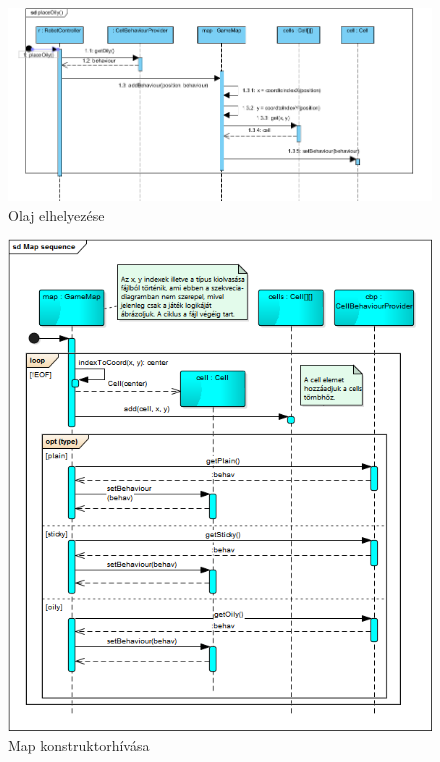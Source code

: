 \begin{figure}[!htbp]
	\begin{center}
		\includegraphics[width=\textwidth, center]{./chapters/chapter03/oily.png}
		\caption{Olaj elhelyezése}
	\end{center}
\end{figure}

\begin{figure}[!htbp]
	\begin{center}
		\includegraphics[width=\textwidth, center]{./chapters/chapter03/map.png}
		\caption{Map konstruktorhívása}
	\end{center}
\end{figure}

